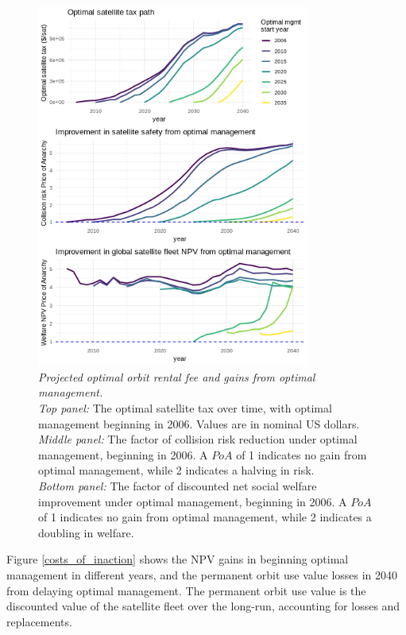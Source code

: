 \documentclass[12pt]{article}
\begin{document}
\begin{figure}[H]
	\centering
	\includegraphics[width=0.8\textwidth]{../../images/manystarts_welfare_and_tax_optstart_2006_remfrac_0_remstart_2025.png}	
	\captionsetup{format=hang}
	\caption[Projected optimal orbit rental fee and gains from optimal management]{\textit{Projected optimal orbit rental fee and gains from optimal management.} \\
		\textit{Top panel:} The optimal satellite tax over time, with optimal management beginning in 2006. Values are in nominal US dollars. \\
		\textit{Middle panel:} The factor of collision risk reduction under optimal management, beginning in 2006. A $PoA$ of 1 indicates no gain from optimal management, while 2 indicates a halving in risk. \\
		\textit{Bottom panel:} The factor of discounted net social welfare improvement under optimal management, beginning in 2006. A $PoA$ of 1 indicates no gain from optimal management, while 2 indicates a doubling in welfare. \\
	}
	\label{projected_tax_path}
\end{figure}

Figure \ref{costs_of_inaction} shows the NPV gains in beginning optimal management in different years, and the permanent orbit use value losses in 2040 from delaying optimal management. The permanent orbit use value is the discounted value of the satellite fleet over the long-run, accounting for losses and replacements.
\end{document}
